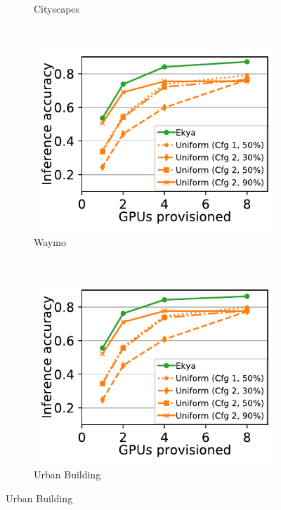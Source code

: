 \begin{figure}
\begin{subfigure}[t]{0.47\linewidth}
    \caption{Cityscapes}
    \label{fig:scalability-gpus-cityscapes-golden}
  \end{subfigure}
  ~~~
  \begin{subfigure}[t]{0.47\linewidth}
    \centering
    \includegraphics[width=\linewidth]{ekya/results/multicam/waymo_scheduler_comparison_across_resources.pdf} 
    \caption{Waymo}
    \label{fig:scalability-gpus-waymo-golden}
  \end{subfigure}
  \\
  \begin{subfigure}[t]{0.47\linewidth}
    \centering
    \includegraphics[width=\linewidth]{ekya/results/multicam/las_vegas_scheduler_comparison_across_resources.pdf} 
    \caption{Urban Building}

\end{subfigure}
\end{figure}
